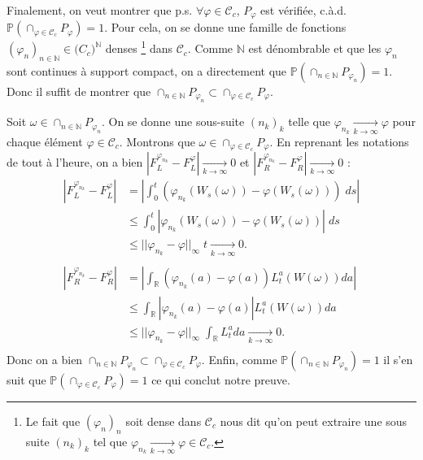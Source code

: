 \documentclass[openany]{book}
\makeatletter
\renewcommand{\P}{\mathds{P}}
\newcommand{\R}{\mathbb{R}}
\newcommand{\1}{\mathbbm{1}}
\renewenvironment{proof}[1][\textbf{\textit{Démonstration}}]{%
  \par\pushQED{\qed}%
  \normalfont\topsep6\p@\@plus6\p@\relax
  \trivlist\item[\hskip\labelsep
    #1\@addpunct{.}]\ignorespaces
}{%
  \popQED\endtrivlist\@endpefalse
}
\theoremstyle{thmfont}
\theoremstyle{deffont}
\theoremstyle{thmfont}
\theoremstyle{deffont}
\makeatother
\begin{document}
\begin{proof}
    Finalement, on veut montrer que p.s. $\forall \varphi \in \mathcal C_c$, $P_\varphi$ est vérifiée, c.à.d. $\P(\cap_{\varphi \in \mathcal C_c} P_\varphi) = 1$. Pour cela, on se donne une famille de fonctions $(\varphi_n)_{n\in \mathbb N} \in \mathcal (C_c)^{\mathbb N}$ denses
 \footnote{Le fait que $(\varphi_n)_n$ soit dense dans $\mathcal C_c$ nous dit qu'on peut extraire une sous suite $(n_k)_k$ tel que $\varphi_{n_k} \xrightarrow[k \to \infty]{} \varphi \in \mathcal C_c$.}
 dans $\mathcal C_c$. Comme $\mathbb N$ est dénombrable et que les $\varphi_n$ sont continues à support compact, on a directement que $\P(\cap_{n\in \mathbb N}P_{\varphi_n})=1$. Donc il suffit de montrer que $\cap_{n\in \mathbb N} P_{\varphi_n} \subset \cap_{\varphi \in \mathcal C_c} P_\varphi$.

  Soit $\omega \in \cap_{n\in \mathbb N}P_{\varphi_n}$. On se donne une sous-suite $(n_k)_k$ telle que $\varphi_{n_k} \xrightarrow[k \to \infty]{} \varphi$ pour chaque élément $\varphi \in \mathcal C_c$. Montrons que $\omega \in \cap_{\varphi \in \mathcal C_c} P_\varphi$. En reprenant les notations de tout à l'heure, on a bien $|F_L^{\varphi_{n_k}} - F_L^\varphi|\xrightarrow[k \to \infty]{} 0$ et $|F_R^{\varphi_{n_k}} - F_R^\varphi|\xrightarrow[k \to \infty]{} 0$ :
%
\begin{align*}
  |F_L^{\varphi_{n_k}} - F_L^\varphi| &= \left|\int_0^t \left( \varphi_{n_k}(W_s(\omega)) - \varphi(W_s(\omega))\right)\; ds\right|\\
                        &\leq \int_0^t \left| \varphi_{n_k}(W_s(\omega)) - \varphi(W_s(\omega))\right|\; ds\\
                        &\leq ||\varphi_{n_k} - \varphi||_{\infty} \;t \xrightarrow[k \to \infty]{} 0.\\
  \\
  |F_R^{\varphi_{n_k}} - F_R^\varphi| &= \left|\int_\R \left( \varphi_{n_k}(a) - \varphi(a)\right) L_t^a(W(\omega)) da\right|\\
                          &\leq \int_\R |\varphi_{n_k}(a) - \varphi(a)| L_t^a(W(\omega)) da\\
                          &\leq ||\varphi_{n_k} - \varphi||_\infty \; \int_\R L_t^a da \xrightarrow[k\to \infty]{} 0.\\
\end{align*}
Donc on a bien $\cap_{n\in \mathbb N} P_{\varphi_n} \subset \cap_{\varphi \in \mathcal C_c} P_\varphi$. Enfin, comme $\P(\cap_{n\in \mathbb N} P_{\varphi_n}) = 1$ il s'en suit que $\P(\cap_{\varphi \in \mathcal C_c} P_\varphi) = 1$ ce qui conclut notre preuve.

  \end{proof}
\end{document}
